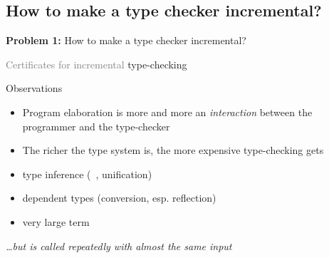 \subsection{How to make a type checker incremental?}

\begin{frame}
  \begin{center}
    \large
    {\bf Problem 1:}
    How to make a type checker incremental?
  \end{center}
\end{frame}

\begin{frame}{\textcolor{gray}{Certificates for incremental} type-checking}

  \begin{block}{Observations}
    \begin{itemize}
    \item Program elaboration is more and more an \emph{interaction}
      between the programmer and the type-checker
    \item The richer the type system is, the more expensive
      type-checking gets
    \end{itemize}
    \begin{example}
      \begin{itemize}
      \item type inference (\eg\ , unification)
      \item dependent types (conversion, esp. reflection)
      \item very large term
      \end{itemize}
    \end{example}
  \end{block}
  \pause
  \begin{center}
    \large \emph{\ldots but is called repeatedly with \emph{almost} the same input}
  \end{center}
\end{frame}

